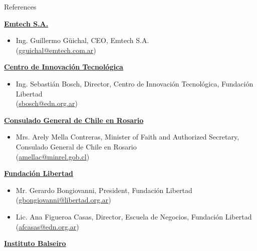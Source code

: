 \documentclass{resume} %
\begin{document}
\begin{rSection}{References}
    \begin{enumerate}[label={[\arabic*]}]
        \item \label{emtech} \href{http://emtech.com.ar/}{\textbf{Emtech S.A.}}
              \begin{itemize}
                  \item Ing. Guillermo Güichal, CEO, Emtech S.A.\\(\href{mailto:gguichal@emtech.com.ar}{gguichal@emtech.com.ar})
              \end{itemize}
        \item \label{cit} \href{https://www.centroit.org.ar/}{\textbf{Centro de Innovación Tecnológica}}
              \begin{itemize}
                  \item Ing. Sebastián Bosch, Director, Centro de Innovación Tecnológica, Fundación Libertad\\(\href{mailto:sbosch@edn.org.ar}{sbosch@edn.org.ar})
              \end{itemize}
        \item \label{chile} \href{https://chile.gob.cl/rosario/}{\textbf{Consulado General de Chile en Rosario}}
              \begin{itemize}
                  \item Mrs. Arely Mella Contreras, Minister of Faith and Authorized Secretary, Consulado General de Chile en Rosario\\(\href{mailto:amellac@minrel.gob.cl}{amellac@minrel.gob.cl})
              \end{itemize}
        \item \label{funlib} \href{https://libertad.org.ar/}{\textbf{Fundación Libertad}}
              \begin{itemize}
                  \item Mr. Gerardo Bongiovanni, President, Fundación Libertad (\href{mailto:gbongiovanni@libertad.org.ar}{gbongiovanni@libertad.org.ar})
                  \item Lic. Ana Figueroa Casas, Director, Escuela de Negocios, Fundación Libertad\\(\href{mailto:afcasas@edn.org.ar}{afcasas@edn.org.ar})
              \end{itemize}
        \item \label{ib} \href{https://www.ib.edu.ar/}{\textbf{Instituto Balseiro}}
              \begin{itemize}

\end{itemize}
\end{enumerate}
\end{rSection}
\end{document}
